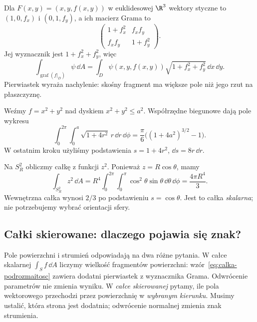 \begin{przyklad}
\label{prz:calka-po-wykresie}
Dla $F(x,y)=(x,y,f(x,y))$ w euklidesowej $\R^3$
wektory styczne to $(1,0,f_x)$ i $(0,1,f_y)$,
a ich macierz Grama to
\[
 \begin{pmatrix}1+f_x^2&f_xf_y\\
                 f_xf_y&1+f_y^2\end{pmatrix}.
\]
Jej wyznacznik jest $1+f_x^2+f_y^2$, więc
\begin{equation}\label{eq:calka-wykres}
 \int_{\operatorname{graf}(f|_D)}\psi\,\dd A
 =\int_D\psi(x,y,f(x,y))
        \sqrt{1+f_x^2+f_y^2}\,\dd x\,\dd y.
\end{equation}
Pierwiastek wyraża nachylenie: skośny fragment
ma większe pole niż jego rzut na płaszczyznę.

Weźmy $f=x^2+y^2$ nad dyskiem $x^2+y^2\leq a^2$.
Współrzędne biegunowe dają pole wykresu
\[
 \int_0^{2\pi}\!\int_0^a
   \sqrt{1+4r^2}\,r\,\dd r\,\dd\phi
 =\frac{\pi}{6}\bigl((1+4a^2)^{3/2}-1\bigr).
\]
W ostatnim kroku użyliśmy podstawienia
$s=1+4r^2$, $\dd s=8r\,\dd r$.
\end{przyklad}

\begin{przyklad}
Na $S_R^2$ obliczmy całkę z funkcji $z^2$.
Ponieważ $z=R\cos\theta$, mamy
\[
 \int_{S_R^2}z^2\,\dd A
 =R^4\int_0^{2\pi}\!\int_0^\pi
       \cos^2\theta\sin\theta\,\dd\theta\,\dd\phi
 =\frac{4\pi R^4}{3}.
\]
Wewnętrzna całka wynosi $2/3$ po podstawieniu
$s=\cos\theta$. Jest to całka \emph{skalarna};
nie potrzebujemy wybrać orientacji sfery.
\end{przyklad}

\subsection*{Całki skierowane: dlaczego pojawia się znak?}
\label{subsec:calki-skierowane}

Pole powierzchni i strumień odpowiadają na dwa różne
pytania. W całce skalarnej
$\int_S f\,\dd A$ liczymy wielkość fragmentów
powierzchni: wzór~\eqref{eq:calka-podrozmaitosc}
zawiera dodatni pierwiastek z wyznacznika Grama.
Odwrócenie parametrów nie zmienia wyniku.
W \emph{całce skierowanej} pytamy, ile pola
wektorowego przechodzi przez powierzchnię
w \emph{wybranym kierunku}. Musimy ustalić,
która strona jest dodatnia; odwrócenie
normalnej zmienia znak strumienia.


